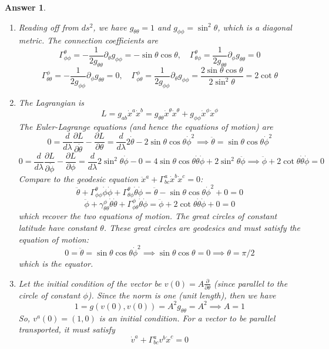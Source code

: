 \documentclass[a4paper]{article}
\newtheorem{ans}{Answer}[subsection]
\theoremstyle{new}
\begin{document}
\begin{ans}\leavevmode
\begin{enumerate}[label=(\alph*)]
\item Reading off from $ds^2$, we have $g_{\theta\theta}=1$ and $g_{\phi\phi}=\sin^2\theta$, which is a diagonal metric. The connection coefficients are
$$\Gamma_{\phi\phi}^\theta=-\frac{1}{2g_{\theta\theta}}\partial_\theta g_{\phi\phi}=-\sin\theta\cos\theta,\quad\Gamma_{\theta\phi}^\theta=\frac{1}{2g_{\theta\theta}}\partial_\phi g_{\theta\theta}=0$$
$$\Gamma^{\phi}_{\theta\theta}=-\frac{1}{2g_{\phi\phi}}\partial_\phi g_{\theta\theta}=0,\quad\Gamma_{\phi\theta}^\phi=\frac{1}{2g_{\phi\phi}}\partial_\theta g_{\phi\phi}=\frac{2\sin\theta\cos\theta}{2\sin^2\theta}=2\cot\theta$$
\item The Lagrangian is
$$L=g_{ab}\dot{x}^a\dot{x}^b=g_{\theta\theta}\dot{x}^\theta\dot{x}^\theta+g_{\phi\phi}\dot{x}^\phi\dot{x}^\phi$$
The Euler-Lagrange equations (and hence the equations of motion) are
$$0=\frac{d}{d\lambda}\frac{\partial L}{\partial\dot{\theta}}-\frac{\partial L}{\partial\theta}=\frac{d}{d\lambda}2\dot{\theta}-2\sin\theta\cos\theta\dot{\phi}^2\implies\ddot{\theta}=\sin\theta\cos\theta\dot{\phi}^2$$
$$0=\frac{d}{d\lambda}\frac{\partial L}{\partial\dot{\phi}}-\frac{\partial L}{\partial\phi}=\frac{d}{d\lambda}2\sin^2\theta\dot{\phi}-0=4\sin\theta\cos\theta\dot{\theta}\dot{\phi}+2\sin^2\theta\ddot{\phi}\implies\ddot{\phi}+2\cot\theta\dot{\theta}\dot{\phi}=0$$
Compare to the geodesic equation $\ddot{x}^a+\Gamma^a_{bc}\dot{x}^b\dot{x}^c=0$:
$$\ddot{\theta}+\Gamma_{\phi\phi}^\theta\dot{\phi}\dot{\phi}+\Gamma_{\theta\phi}^\theta\dot{\theta}\dot{\phi}=\ddot{\theta}-\sin\theta\cos\theta\dot{\phi}^2+0=0$$
$$\ddot{\phi}+\gamma_{\theta\theta}^\phi\dot{\theta}\dot{\theta}+\Gamma_{\phi\theta}^\phi\dot{\theta}\dot{\phi}=\ddot{\phi}+2\cot\theta\dot{\theta}\dot{\phi}+0=0$$
which recover the two equations of motion. The great circles of constant latitude have constant $\theta$. These great circles are geodesics and must satisfy the equation of motion:
$$0=\ddot{\theta}=\sin\theta\cos\theta\dot{\phi}^2\implies\sin\theta\cos\theta=0\implies\theta=\pi/2$$
which is the equator.
\item Let the initial condition of the vector be $v(0)=A\frac{\partial}{\partial\theta}$ (since parallel to the circle of constant $\phi$). Since the norm is one (unit length), then we have
$$1=g(v(0),v(0))=A^2g_{\theta\theta}=A^2\implies A=1$$
So, $v^a(0)=(1,0)$ is an initial condition. For a vector to be parallel transported, it must satisfy
$$\dot{v}^a+\Gamma_{bc}^av^b\dot{x}^c=0$$

\end{enumerate}
\end{ans}
\end{document}
